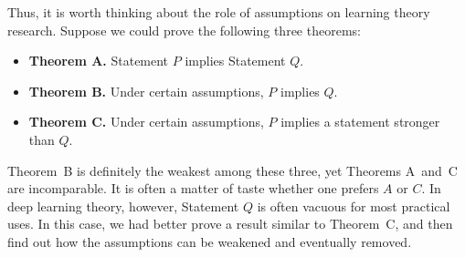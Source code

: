\documentclass[11pt]{article}
\begin{document}
	Thus, it is worth thinking about the role of assumptions on learning theory research. Suppose we could prove the following three theorems:
	\begin{itemize}
		\item \textbf{Theorem A.} Statement $P$ implies Statement $Q$.
		\item \textbf{Theorem B.} Under certain assumptions, $P$ implies $Q$.
		\item \textbf{Theorem C.} Under certain assumptions, $P$ implies a statement stronger than $Q$.
	\end{itemize}
	Theorem~B is definitely the weakest among these three, yet Theorems A~and~C are incomparable. It is often a matter of taste whether one prefers $A$ or $C$. In deep learning theory, however, Statement $Q$ is often vacuous for most practical uses. In this case, we had better prove a result similar to Theorem~C, and then find out how the assumptions can be weakened and eventually removed.




\end{document}

